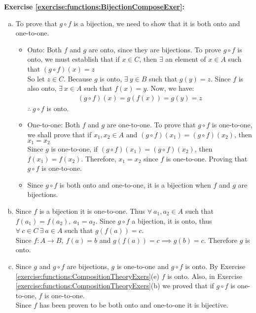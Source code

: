 \noindent\textbf{Exercise \ref{exercise:functions:BijectionComposeExer}:} %
\begin{enumerate}[(a)]
\item \label{BijectionComposeExer-gf}
To prove that $g\circ f$ is a bijection, we need to show that it is both onto and one-to-one.
	\begin{itemize}        
	\item
	Onto: Both $f$ and $g$ are onto, since they are bijections. To prove $g\circ f$ is onto, we must establish that if $x\in C$, then $\exists$ an element of $x\in A$ such that $(g\circ f)(x) = z$\\
	So let $z\in C$. Because $g$ is onto, $\exists\ y\in B$ such that $g(y) = z$. Since $f$ is also onto, $\exists\ x\in A$ such that $f(x) = y$. Now, we have:
	\begin{align*}
	(g\circ f)(x) = g(f(x)) = g(y) = z
	\end{align*}
	$\therefore\ g\circ f$ is onto.
	 
	\item
	One-to-one: Both $f$ and $g$ are one-to-one. To prove that $g\circ f$ is one-to-one, we shall prove that if $x_{1},x_{2}\in A$ and $(g\circ f)(x_{1}) = (g\circ f)(x_{2})$, then $x_{1} = x_{2}$\\
	Since $g$ is one-to-one, if $(g\circ f)(x_{1}) = (g\circ f)(x_{2})$, then $f(x{_1}) = f(x_{2})$. Therefore, $x_{1} = x_{2}$ since $f$ is one-to-one. Proving that $g\circ f$ is one-to-one.
	
	\item
	Since $g\circ f$ is both onto and one-to-one, it is a bijection when $f$ and $g$ are bijections.  
	\end{itemize}
	  
\item  \label{BijectionComposeExer-g}
Since $f$ is a bijection it is one-to-one. Thus $\forall\ a_{1},a_{2}\in A$ such that $f(a_{1}) = f(a_{2}),\ a_{1} = a_{2}$. Since $g\circ f$ a bijection, it is onto, thus $\forall\ c\in C\ \exists\ a\in A$ such that $g(f(a)) = c$.\\
Since $f\colon A\to B,\ f(a) = b$ and $g(f(a)) = c \implies g(b) = c$. Therefore $g$ is onto.

\item \label{BijectionComposeExer-f}
Since $g$ and $g\circ f$ are bijections, $g$ is one-to-one and $g\circ f$ is onto. By Exercise \ref{exercise:functions:CompositionTheoryExers}(e) $f$ is onto. Also, in Exercise \ref{exercise:functions:CompositionTheoryExers}(b) we proved that if $g\circ f$ is one-to-one, $f$ is one-to-one.\\
Since $f$ has been proven to be both onto and one-to-one it is bijective.
\end{enumerate}

